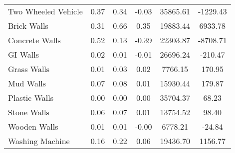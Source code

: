 \begin{tabular}{lccccc}
 Two Wheeled Vehicle &       0.37 &       0.34 &      -0.03 &   35865.61 &   -1229.43 \\
         Brick Walls &       0.31 &       0.66 &       0.35 &   19883.44 &    6933.78 \\
      Concrete Walls &       0.52 &       0.13 &      -0.39 &   22303.87 &   -8708.71 \\
            GI Walls &       0.02 &       0.01 &      -0.01 &   26696.24 &    -210.47 \\
         Grass Walls &       0.01 &       0.03 &       0.02 &    7766.15 &     170.95 \\
           Mud Walls &       0.07 &       0.08 &       0.01 &   15930.44 &     179.87 \\
       Plastic Walls &       0.00 &       0.00 &       0.00 &   35704.37 &      68.23 \\
         Stone Walls &       0.06 &       0.07 &       0.01 &   13754.52 &      98.40 \\
        Wooden Walls &       0.01 &       0.01 &      -0.00 &    6778.21 &     -24.84 \\
     Washing Machine &       0.16 &       0.22 &       0.06 &   19436.70 &    1156.77 \\
\hline
\end{tabular}
